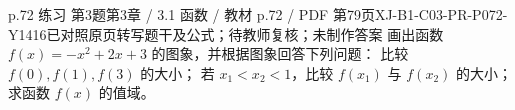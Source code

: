 \par\noindent\begin{minipage}{\linewidth}
\begin{bankitem}{p.72 练习 第3题}{第3章 / 3.1 函数 / 教材 p.72 / PDF 第79页}{XJ-B1-C03-PR-P072-Y1416}{已对照原页转写题干及公式；待教师复核；未制作答案}
画出函数 $f(x)=-x^2+2x+3$ 的图象，并根据图象回答下列问题：
比较 $f(0),f(1),f(3)$ 的大小；
若 $x_1<x_2<1$，比较 $f(x_1)$ 与 $f(x_2)$ 的大小；
求函数 $f(x)$ 的值域。
\end{bankitem}
\end{minipage}\par\medskip
